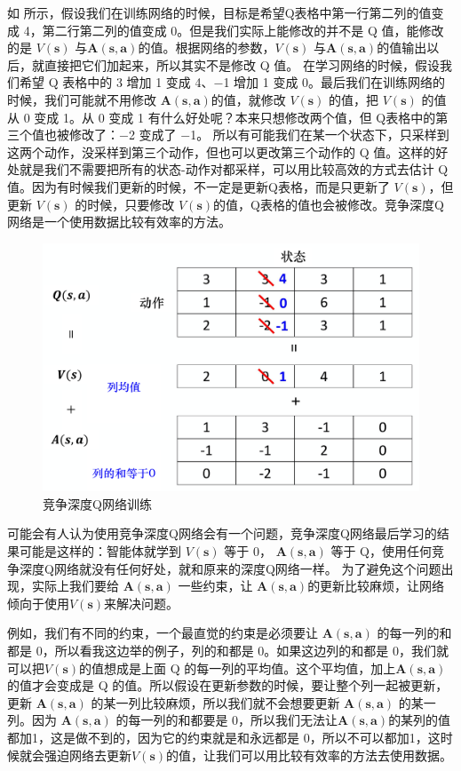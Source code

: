 如 所示，假设我们在训练网络的时候，目标是希望Q表格中第一行第二列的值变成 4，第二行第二列的值变成 0。但是我们实际上能修改的并不是 Q 值，能修改的是 $V(\boldsymbol{s})$ 与$\boldsymbol{A}(\boldsymbol{s},\boldsymbol{a})$的值。根据网络的参数，$V(\boldsymbol{s})$ 与$\boldsymbol{A}(\boldsymbol{s},\boldsymbol{a})$的值输出以后，就直接把它们加起来，所以其实不是修改 Q 值。
在学习网络的时候，假设我们希望 Q 表格中的 3 增加 1 变成 4、$-$1 增加 1 变成 0。最后我们在训练网络的时候，我们可能就不用修改 $\boldsymbol{A}(\boldsymbol{s},\boldsymbol{a})$的值，就修改 $V(\boldsymbol{s})$ 的值，把 $V(\boldsymbol{s})$ 的值从 0 变成 1。从 0 变成 1 有什么好处呢？本来只想修改两个值，但 Q表格中的第三个值也被修改了：$-$2 变成了 $-$1。
所以有可能我们在某一个状态下，只采样到这两个动作，没采样到第三个动作，但也可以更改第三个动作的 Q 值。这样的好处就是我们不需要把所有的状态-动作对都采样，可以用比较高效的方式去估计 Q 值。因为有时候我们更新的时候，不一定是更新Q表格，而是只更新了 $V(\boldsymbol{s})$，但更新 $V(\boldsymbol{s})$ 的时候，只要修改 $V(\boldsymbol{s})$的值，Q表格的值也会被修改。竞争深度Q网络是一个使用数据比较有效率的方法。

\begin{figure}[htb]
    \centering
    \includegraphics[width=0.5\linewidth]{res/ch7/7.5}
    \caption{竞争深度Q网络训练}
    \label{fig:dueling_dqn_2}
\end{figure}

可能会有人认为使用竞争深度Q网络会有一个问题，竞争深度Q网络最后学习的结果可能是这样的：智能体就学到 $V(\boldsymbol{s})$ 等于 0， $\boldsymbol{A}(\boldsymbol{s},\boldsymbol{a})$ 等于 Q，使用任何竞争深度Q网络就没有任何好处，就和原来的深度Q网络一样。
为了避免这个问题出现，实际上我们要给 $\boldsymbol{A}(\boldsymbol{s},\boldsymbol{a})$ 一些约束，让 $\boldsymbol{A}(\boldsymbol{s},\boldsymbol{a})$的更新比较麻烦，让网络倾向于使用$V(\boldsymbol{s})$来解决问题。

例如，我们有不同的约束，一个最直觉的约束是必须要让 $\boldsymbol{A}(\boldsymbol{s},\boldsymbol{a})$ 的每一列的和都是 0，所以看我这边举的例子，列的和都是 0。如果这边列的和都是 0，我们就可以把$V(\boldsymbol{s})$的值想成是上面 Q 的每一列的平均值。这个平均值，加上$\boldsymbol{A}(\boldsymbol{s},\boldsymbol{a})$的值才会变成是 Q 的值。所以假设在更新参数的时候，要让整个列一起被更新，
更新  $\boldsymbol{A}(\boldsymbol{s},\boldsymbol{a})$ 的某一列比较麻烦，所以我们就不会想要更新 $\boldsymbol{A}(\boldsymbol{s},\boldsymbol{a})$ 的某一列。因为 $\boldsymbol{A}(\boldsymbol{s},\boldsymbol{a})$ 的每一列的和都要是 0，所以我们无法让$\boldsymbol{A}(\boldsymbol{s},\boldsymbol{a})$的某列的值都加1，这是做不到的，因为它的约束就是和永远都是 0，所以不可以都加1，这时候就会强迫网络去更新$V(\boldsymbol{s})$的值，让我们可以用比较有效率的方法去使用数据。

